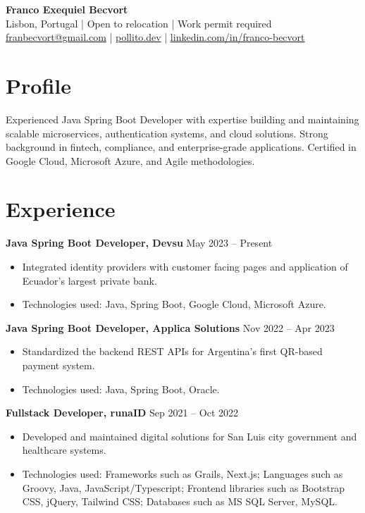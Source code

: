 \documentclass[10pt, letterpaper]{article}
\begin{document}
\begin{center}
    {\LARGE\bfseries Franco Exequiel Becvort} \\
    Lisbon, Portugal | Open to relocation | Work permit required \\
    \href{mailto:franbecvort@gmail.com}{franbecvort@gmail.com} | 
    \href{https://pollito.dev/}{pollito.dev} | 
    \href{https://linkedin.com/in/franco-becvort}{linkedin.com/in/franco-becvort} \\
\end{center}

\vspace{5pt}

\section{Profile}
Experienced Java Spring Boot Developer with expertise building and maintaining scalable microservices, authentication systems, and cloud solutions. Strong background in fintech, compliance, and enterprise-grade applications. Certified in Google Cloud, Microsoft Azure, and Agile methodologies.

\section{Experience}
\textbf{Java Spring Boot Developer, Devsu} \hfill May 2023 – Present \
\begin{itemize}[leftmargin=10pt, noitemsep]
    \item Integrated identity providers with customer facing pages and application of Ecuador’s largest private bank.
    \item Technologies used: Java, Spring Boot, Google Cloud, Microsoft Azure.
\end{itemize}

\textbf{Java Spring Boot Developer, Applica Solutions} \hfill Nov 2022 – Apr 2023 \
\begin{itemize}[leftmargin=10pt, noitemsep]
    \item Standardized the backend REST APIs for Argentina’s first QR-based payment system.
    \item Technologies used: Java, Spring Boot, Oracle.
\end{itemize}

\textbf{Fullstack Developer, runaID} \hfill Sep 2021 – Oct 2022 \
\begin{itemize}[leftmargin=10pt, noitemsep]
    \item Developed and maintained digital solutions for San Luis city government and healthcare systems.
    \item Technologies used: Frameworks such as Grails, Next.js; Languages such as Groovy, Java, JavaScript/Typescript; Frontend libraries such as Bootstrap CSS, jQuery, Tailwind CSS; Databases such as MS SQL Server, MySQL.
\end{itemize}
\end{document}
